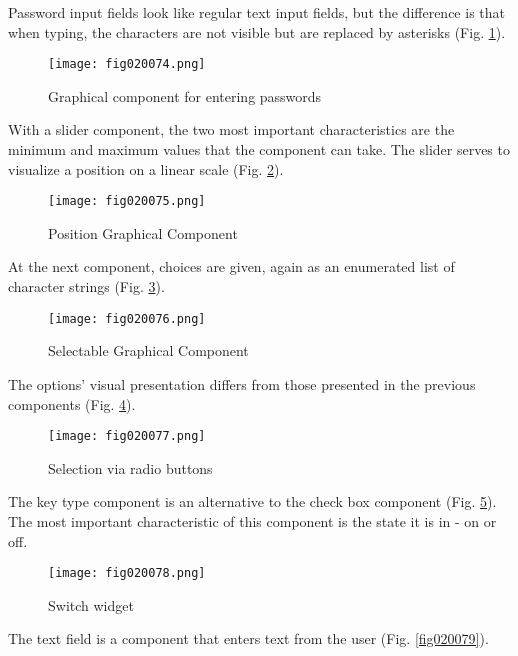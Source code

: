 Password input fields look like regular text input fields, but the difference is that when typing, the characters are not visible but are replaced by asterisks (Fig. \ref{fig020074}).

\begin{figure}[H]
   \centering
   \texttt{[image: fig020074.png]}
   \caption{Graphical component for entering passwords}
\label{fig020074}
\end{figure}

With a slider component, the two most important characteristics are the minimum and maximum values that the component can take. The slider serves to visualize a position on a linear scale (Fig. \ref{fig020075}).

\begin{figure}[H]
   \centering
   \texttt{[image: fig020075.png]}
   \caption{Position Graphical Component}
\label{fig020075}
\end{figure}

At the next component, choices are given, again as an enumerated list of character strings (Fig. \ref{fig020076}).

\begin{figure}[H]
   \centering
   \texttt{[image: fig020076.png]}
   \caption{Selectable Graphical Component}
\label{fig020076}
\end{figure}

The options' visual presentation differs from those presented in the previous components (Fig. \ref{fig020077}).

\begin{figure}[H]
   \centering
   \texttt{[image: fig020077.png]}
   \caption{Selection via radio buttons}
\label{fig020077}
\end{figure}

The key type component is an alternative to the check box component (Fig. \ref{fig020078}). The most important characteristic of this component is the state it is in - on or off.

\begin{figure}[H]
   \centering
   \texttt{[image: fig020078.png]}
   \caption{Switch widget}
\label{fig020078}
\end{figure}

The text field is a component that enters text from the user (Fig. \ref{fig020079}).

